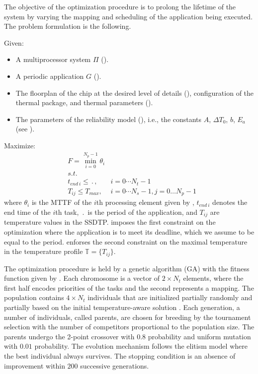 The objective of the optimization procedure is to prolong the lifetime of the system by varying the mapping and scheduling of the application being executed. The problem formulation is the following.

Given:

\begin{itemize}
  \item A multiprocessor system $\Pi$ ().
  \item A periodic application $G$ ().
  \item The floorplan of the chip at the desired level of details (), configuration of the thermal package, and thermal parameters ().
  \item The parameters of the reliability model (), i.e., the constants $A$, $\Delta T_0$, $b$, $E_a$ (see ).
\end{itemize}

Maximize:
\begin{align}
  & F = \min_{i = 0}^{N_p - 1} \theta_i \label{eq:fitness-function} \\
  & s.t. \nonumber \\
  & t_{end \: i} \leq \period, & i = 0 \cdots N_t - 1 \label{eq:deadline} \\
  & T_{ij} \leq T_{max},       & i = 0 \cdots N_s - 1, j = 0 \dots N_p - 1 \label{eq:t-max}
\end{align}
where $\theta_i$ is the MTTF of the $i$th processing element given by , $t_{end \: i}$ denotes the end time of the $i$th task, $\period$ is the period of the application, and $T_{ij}$ are temperature values in the SSDTP.  imposes the first constraint on the optimization where the application is to meet its deadline, which we assume to be equal to the period.  enforses the second constraint on the maximal temperature in the temperature profile $\mathbb{T} = \{ T_{ij} \}$.

The optimization procedure is held by a genetic algorithm (GA) \cite{schmitz2004} with the fitness function given by . Each chromosome is a vector of $2 \times N_t$ elements, where the first half encodes priorities of the tasks and the second represents a mapping. The population contains $4 \times N_t$ individuals that are initialized partially randomly and partially based on the initial temperature-aware solution \cite{xie2006}. Each generation, a number of individuals, called parents, are chosen for breeding by the tournament selection with the number of competitors proportional to the population size. The parents undergo the 2-point crossover with $0.8$ probability and uniform mutation with $0.01$ probability. The evolution mechanism follows the elitism model where the best individual always survives. The stopping condition is an absence of improvement within $200$ successive generations.

